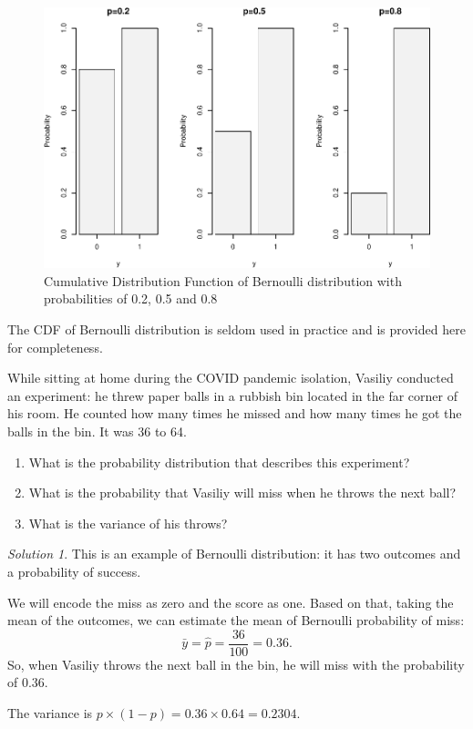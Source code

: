 \documentclass[
]{book}
\providecommand{\tightlist}{%
  \setlength{\itemsep}{0pt}\setlength{\parskip}{0pt}}
\theoremstyle{definition}
\theoremstyle{definition}
\theoremstyle{definition}
\theoremstyle{definition}
\theoremstyle{remark}
\newtheorem*{solution}{Solution}
\begin{document}
\begin{figure}
\centering
\includegraphics{Svetunkov---Statistics-for-Business-Analytics_files/figure-latex/bernoulliCDF-1.pdf}
\caption{\label{fig:bernoulliCDF}Cumulative Distribution Function of Bernoulli distribution with probabilities of 0.2, 0.5 and 0.8}
\end{figure}

The CDF of Bernoulli distribution is seldom used in practice and is provided here for completeness.

While sitting at home during the COVID pandemic isolation, Vasiliy conducted an experiment: he threw paper balls in a rubbish bin located in the far corner of his room. He counted how many times he missed and how many times he got the balls in the bin. It was 36 to 64.

\begin{enumerate}
\def\labelenumi{\arabic{enumi}.}
\tightlist
\item
  What is the probability distribution that describes this experiment?
\item
  What is the probability that Vasiliy will miss when he throws the next ball?
\item
  What is the variance of his throws?
\end{enumerate}

\begin{solution}
This is an example of Bernoulli distribution: it has two outcomes and a probability of success.

We will encode the miss as zero and the score as one. Based on that, taking the mean of the outcomes, we can estimate the mean of Bernoulli probability of miss:
\begin{equation*}
    \bar{y} = \hat{p} = \frac{36}{100} = 0.36.
\end{equation*}
So, when Vasiliy throws the next ball in the bin, he will miss with the probability of 0.36.

The variance is \(p \times (1-p) = 0.36 \times 0.64 = 0.2304\).
\end{solution}
\end{document}
